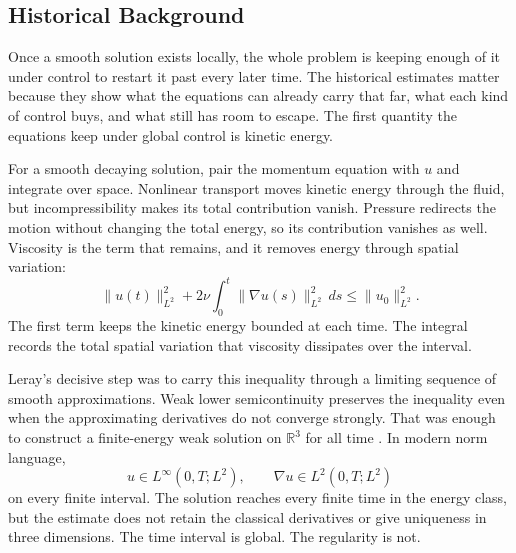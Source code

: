 \subsection{Historical Background}\label{sub:HistoricalEstimates}

Once a smooth solution exists locally, the whole problem is keeping enough of it under control to restart it past every later time.
The historical estimates matter because they show what the equations can already carry that far, what each kind of control buys, and what still has room to escape.
The first quantity the equations keep under global control is kinetic energy.


For a smooth decaying solution, pair the momentum equation with \(u\) and integrate over space.
Nonlinear transport moves kinetic energy through the fluid, but incompressibility makes its total contribution vanish.
Pressure redirects the motion without changing the total energy, so its contribution vanishes as well.
Viscosity is the term that remains, and it removes energy through spatial variation:
\begin{equation}\label{eq:LerayEnergyInequality}
  \lVert u(t)\rVert_{L^2}^{2}
  +2\nu\int_0^t\lVert\nabla u(s)\rVert_{L^2}^{2}\,ds
  \leq
  \lVert u_0\rVert_{L^2}^{2}.
\end{equation}
The first term keeps the kinetic energy bounded at each time.
The integral records the total spatial variation that viscosity dissipates over the interval.

Leray's decisive step was to carry this inequality through a limiting sequence of smooth approximations.
Weak lower semicontinuity preserves the inequality even when the approximating derivatives do not converge strongly.
That was enough to construct a finite-energy weak solution on \(\mathbb R^3\) for all time \parencite{Leray1934}.
In modern norm language,
\[
  u\in L^\infty(0,T;L^2),
  \qquad
  \nabla u\in L^2(0,T;L^2)
\]
on every finite interval.
The solution reaches every finite time in the energy class, but the estimate does not retain the classical derivatives or give uniqueness in three dimensions.
The time interval is global.
The regularity is not.


